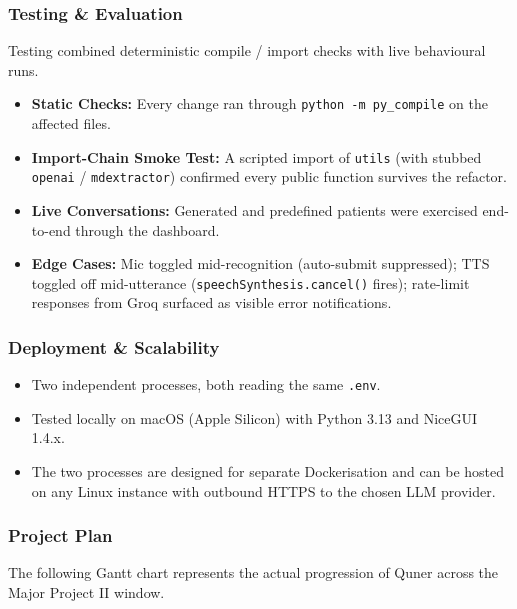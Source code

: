 \documentclass{article}
\begin{document}
\subsubsection{Testing \& Evaluation}
Testing combined deterministic compile / import checks with live behavioural runs.

\begin{itemize}
    \item \textbf{Static Checks:} Every change ran through \texttt{python -m py\_compile} on the affected files.
    \item \textbf{Import-Chain Smoke Test:} A scripted import of \texttt{utils} (with stubbed \texttt{openai} / \texttt{mdextractor}) confirmed every public function survives the refactor.
    \item \textbf{Live Conversations:} Generated and predefined patients were exercised end-to-end through the dashboard.
    \item \textbf{Edge Cases:} Mic toggled mid-recognition (auto-submit suppressed); TTS toggled off mid-utterance (\texttt{speechSynthesis.cancel()} fires); rate-limit responses from Groq surfaced as visible error notifications.
\end{itemize}

\subsubsection{Deployment \& Scalability}
\begin{itemize}
    \item Two independent processes, both reading the same \texttt{.env}.
    \item Tested locally on macOS (Apple Silicon) with Python 3.13 and NiceGUI 1.4.x.
    \item The two processes are designed for separate Dockerisation and can be hosted on any Linux instance with outbound HTTPS to the chosen LLM provider.
\end{itemize}

\newpage
\subsubsection{Project Plan}

The following Gantt chart represents the actual progression of Quner across the Major Project II window.\\[2ex]
\end{document}
